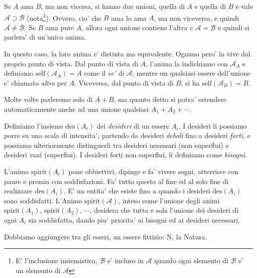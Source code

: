 Se $A$ ama $B$, ma non vicersa, si hanno due unioni, quella di $A$ e quella di $B$ e vale $\mathcal{A} \supset \mathcal{B}$ (nota\footnote{E' l'inclusione insiemistica, $\mathcal{B}$ e' incluso in $\mathcal{A}$ quando ogni elemento di $\mathcal{B}$ e' un elemento di $\mathcal{A}$}).  Ovvero, cio' che $B$ ama lo ama $A$, ma non viceversa, e quindi $\mathcal{A} \neq \mathcal{B}$. Se $B$ ama pure $A$, allora ogni unione contiene l'altra e $\mathcal{A} = \mathcal{B}$ e quindi si parlera' di un'unica anima. 

In questo caso, la loro anima e' distinta ma equivalente.  Ognuno pero' la vive dal proprio punto di vista. Dal punto di vista di $A$, l'anima la indichiamo con $\mathcal{A}_A$ e definiamo $\textrm{self}(\mathcal{A}_A)=A$ come il \emph{se'} di $\mathcal{A}$, mentre un qualsiasi essere dell'unione e' chiamato \emph{altro} per $A$. Viceversa, dal punto di vista di $B$, si ha $\textrm{self}(\mathcal{A}_B)=B$.

Molte volte parleremo solo di $A+B$, ma quanto detto si potra' estendere automaticamente anche ad una unione qualsiasi $A_1+A_2+\cdots$. \\

\def\des{\textrm{des}}

Definiamo l'insieme $\des(A_i)$ dei \emph{desideri} di un essere $A_i$. I desideri li possiamo porre su una scala di intensita', partendo da desideri \emph{deboli} fino a desideri \emph{forti}, e possiamo ulteriormente distinguerli tra desideri necessari (non superflui) e desideri vani (superflui). I desideri forti non superflui, li definiamo come \emph{bisogni}.

\def\anima#1{\mathcal{#1}}

\def\spirit#1{\textrm{spirit}(#1)}
\def\Animo#1{\spirit{\anima{#1}}}

L'animo $\spirit{A_i}$ pone obbiettivi, dipinge e fa' vivere sogni, atterrisce con paure e premia con soddisfazioni. Fa' tutto questo al fine ed al solo fine di realizzare $\des(A_i)$. E' un entita' che esiste fino a quando i desideri $\des(A_i)$ sono soddisfatti. L'Animo $\Animo{A}$, inteso come l'unione degli animi $\spirit{A_1}$, $\spirit{A_2}$, $\cdots$,  desidera che tutta e sola l'unione dei desideri di ogni $A_i$ sia soddisfatta, dando piu' priorita' ai bisogni ed ai desideri necessari.

Dobbiamo aggiungere tra gli esseri, un essere fittizio: N, la Natura.

